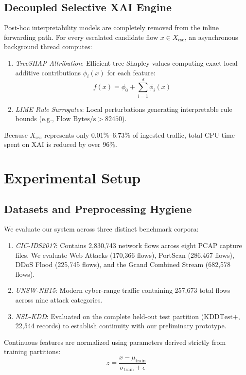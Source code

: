 \documentclass[conference]{IEEEtran}
\begin{document}
\subsection{Decoupled Selective XAI Engine}
Post-hoc interpretability models are completely removed from the inline forwarding path. For every escalated candidate flow $x \in X_{\text{esc}}$, an asynchronous background thread computes:
\begin{enumerate}
    \item \textit{TreeSHAP Attribution}: Efficient tree Shapley values computing exact local additive contributions $\phi_i(x)$ for each feature:
    \begin{equation}
    f(x) = \phi_0 + \sum_{i=1}^d \phi_i(x)
    \label{eq:shap}
    \end{equation}
    \item \textit{LIME Rule Surrogates}: Local perturbations generating interpretable rule bounds (e.g., $\text{Flow Bytes/s} > 82450$).
\end{enumerate}
Because $X_{\text{esc}}$ represents only $0.01\%\text{--}6.73\%$ of ingested traffic, total CPU time spent on XAI is reduced by over $96\%$.

\section{Experimental Setup}

\subsection{Datasets and Preprocessing Hygiene}
We evaluate our system across three distinct benchmark corpora:
\begin{enumerate}
    \item \textit{CIC-IDS2017}: Contains 2,830,743 network flows across eight PCAP capture files. We evaluate Web Attacks (170,366 flows), PortScan (286,467 flows), DDoS Flood (225,745 flows), and the Grand Combined Stream (682,578 flows).
    \item \textit{UNSW-NB15}: Modern cyber-range traffic containing 257,673 total flows across nine attack categories.
    \item \textit{NSL-KDD}: Evaluated on the complete held-out test partition ($\text{KDDTest+}$, 22,544 records) to establish continuity with our preliminary prototype.
\end{enumerate}

Continuous features are normalized using parameters derived strictly from training partitions:
\begin{equation}
z = \frac{x - \mu_{\text{train}}}{\sigma_{\text{train}} + \epsilon}
\label{eq:norm}
\end{equation}
\end{document}
